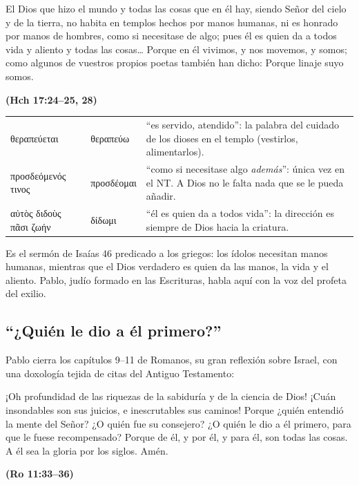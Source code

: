 \documentclass[11pt,letterpaper]{article}
\newcommand{\grc}[1]{\foreignlanguage{ancientgreek}{#1}}
\newcommand{\fuente}[1]{\par\hfill{\upshape\bfseries\small\textcolor{azul}{#1}}}
\begin{document}
\begin{cita}El Dios que hizo el mundo y todas las cosas que en él hay, siendo Señor del cielo y de la tierra, no habita en templos hechos por manos humanas, ni es honrado por manos de hombres, como si necesitase de algo; pues él es quien da a todos vida y aliento y todas las cosas\ldots{} Porque en él vivimos, y nos movemos, y somos; como algunos de vuestros propios poetas también han dicho: Porque linaje suyo somos.\fuente{(Hch 17:24--25, 28)}\end{cita}

\begin{filologia}[Hch 17:25]
\begin{tabular}{@{}L{3.2cm}L{1.6cm}L{10cm}@{}}
\grc{θεραπεύεται} & \grc{θεραπεύω} & ``es servido, atendido'': la palabra del cuidado de los dioses en el templo (vestirlos, alimentarlos). \\[2pt]
\grc{προσδεόμενός τινος} & \grc{προσδέομαι} & ``como si necesitase algo \emph{además}'': única vez en el NT. A Dios no le falta nada que se le pueda añadir. \\[2pt]
\grc{αὐτὸς διδοὺς πᾶσι ζωήν} & \grc{δίδωμι} & ``él es quien da a todos vida'': la dirección es siempre de Dios hacia la criatura. \\
\end{tabular}
\end{filologia}

Es el sermón de Isaías 46 predicado a los griegos: los ídolos necesitan manos humanas, mientras que el Dios verdadero es quien da las manos, la vida y el aliento. Pablo, judío formado en las Escrituras, habla aquí con la voz del profeta del exilio.

\subsection{``¿Quién le dio a él primero?''}
Pablo cierra los capítulos 9--11 de Romanos, su gran reflexión sobre Israel, con una doxología tejida de citas del Antiguo Testamento:

\begin{cita}¡Oh profundidad de las riquezas de la sabiduría y de la ciencia de Dios! ¡Cuán insondables son sus juicios, e inescrutables sus caminos! Porque ¿quién entendió la mente del Señor? ¿O quién fue su consejero? ¿O quién le dio a él primero, para que le fuese recompensado? Porque de él, y por él, y para él, son todas las cosas. A él sea la gloria por los siglos. Amén.\fuente{(Ro 11:33--36)}\end{cita}
\end{document}
